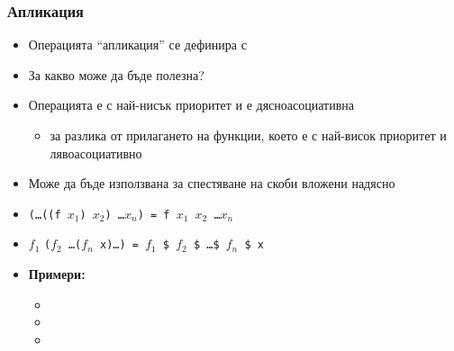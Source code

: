 \documentclass[alsotrans,beameroptions={aspectratio=169}]{beamerswitch}
\begin{document}
\begin{frame}
  \frametitle{Апликация}

  \begin{itemize}[<+->]
  \item Операцията ``апликация'' се дефинира с 
  \item За какво може да бъде полезна?
  \item Операцията \lst{$} е с най-нисък приоритет и е дясноасоциативна
    \begin{itemize}
    \item за разлика от прилагането на функции, което е с най-висок приоритет и лявоасоциативно
    \end{itemize}
  \item Може да бъде използвана за спестяване на скоби вложени надясно
  \item \tt(\ldots\tt{((f} $x_1$\tt) $x_2$\tt) \ldots $x_n$\tt) = \tt f $x_1$ $x_2$ \ldots $x_n$
  \item $f_1$ \tt($f_2$ \ldots \tt($f_n$ \tt{x)}\ldots\tt) = $f_1$ \tt\$ $f_2$ \tt\$ \ldots \tt\$ $f_n$ \tt{\$ x}
  \item \textbf{Примери:}
    \begin{itemize}
    \item {}
    \item {}
    \item {}
    \end{itemize}
  \end{itemize}
\end{frame}
\end{document}
